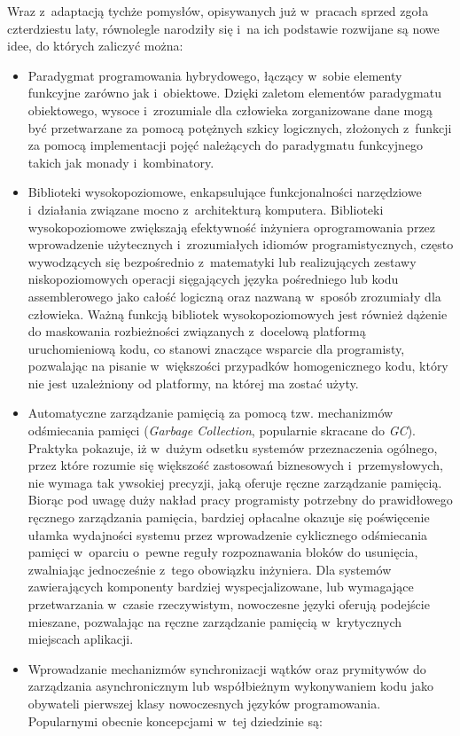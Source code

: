 \par{
Wraz z~adaptacją tychże pomysłów, opisywanych już w~pracach sprzed zgoła czterdziestu laty, równolegle narodziły się i~na ich podstawie rozwijane są nowe idee, do których zaliczyć można:
\begin{itemize}
  \item Paradygmat programowania hybrydowego, łączący w~sobie elementy funkcyjne zarówno jak i~obiektowe. Dzięki zaletom elementów paradygmatu obiektowego, wysoce i~zrozumiale dla człowieka zorganizowane dane mogą być przetwarzane za pomocą potężnych szkicy logicznych, złożonych z~funkcji za pomocą implementacji pojęć należących do paradygmatu funkcyjnego takich jak monady i~kombinatory.
  \item Biblioteki wysokopoziomowe, enkapsulujące funkcjonalności narzędziowe i~działania związane mocno z~architekturą komputera. Biblioteki wysokopoziomowe zwiększają efektywność inżyniera oprogramowania przez wprowadzenie użytecznych i~zrozumiałych idiomów programistycznych, często wywodzących się bezpośrednio z~matematyki lub realizujących zestawy niskopoziomowych operacji sięgających języka pośredniego lub kodu assemblerowego jako całość logiczną oraz nazwaną w~sposób zrozumiały dla człowieka. Ważną funkcją bibliotek wysokopoziomowych jest również dążenie do maskowania rozbieżności związanych z~docelową platformą uruchomieniową kodu, co stanowi znaczące wsparcie dla programisty, pozwalając na pisanie w~większości przypadków homogenicznego kodu, który nie jest uzależniony od platformy, na której ma zostać użyty.
  \item Automatyczne zarządzanie pamięcią za pomocą tzw. mechanizmów odśmiecania pamięci (\emph{Garbage Collection}, popularnie skracane do \emph{GC}). Praktyka pokazuje, iż w~dużym odsetku systemów przeznaczenia ogólnego, przez które rozumie się większość zastosowań biznesowych i~przemysłowych, nie wymaga tak ywsokiej precyzji, jaką oferuje ręczne zarządzanie pamięcią. Biorąc pod uwagę duży nakład pracy programisty potrzebny do prawidłowego ręcznego zarządzania pamięcia, bardziej opłacalne okazuje się poświęcenie ułamka wydajności systemu przez wprowadzenie cyklicznego odśmiecania pamięci w~oparciu o~pewne reguły rozpoznawania bloków do usunięcia, zwalniając jednocześnie z~tego obowiązku inżyniera. Dla systemów zawierających komponenty bardziej wyspecjalizowane, lub wymagające przetwarzania w~czasie rzeczywistym, nowoczesne języki oferują podejście mieszane, pozwalając na ręczne zarządzanie pamięcią w~krytycznych miejscach aplikacji.
  \item Wprowadzanie mechanizmów synchronizacji wątków oraz prymitywów do zarządzania asynchronicznym lub współbieżnym wykonywaniem kodu jako obywateli pierwszej klasy nowoczesnych języków programowania. Popularnymi obecnie koncepcjami w~tej dziedzinie są:

\end{itemize}}
